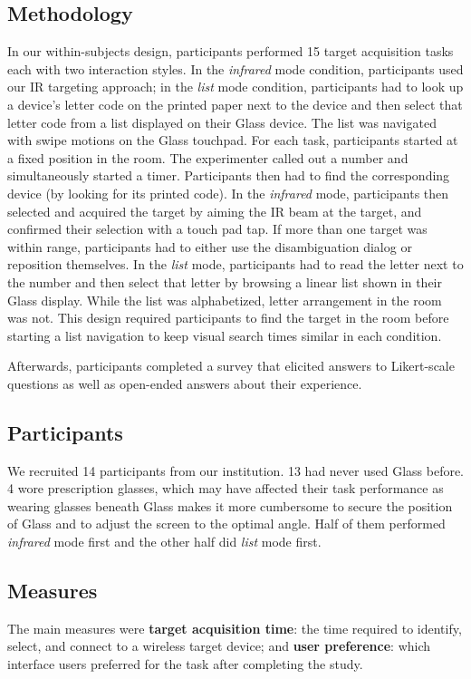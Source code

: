 \subsection{Methodology}
In our within-subjects design, participants performed 15 target acquisition tasks each with two interaction styles. In the {\em infrared} mode condition, participants used our IR targeting approach; in the {\em list} mode condition, participants had to look up a device's letter code on the printed paper next to the device and then select that letter code from a list displayed on their Glass device. The list was navigated with swipe motions on the Glass touchpad. For each task, participants started at a fixed position in the room. The experimenter called out a number and simultaneously started a timer. Participants then had to find the corresponding device (by looking for its printed code). In the {\em infrared} mode, participants then selected and acquired the target by aiming the IR beam at the target, and confirmed their selection with a touch pad tap. If more than one target was within range, participants had to either use the disambiguation dialog or reposition themselves. In the {\em list} mode, participants had to read the letter next to the number and then select that letter by browsing a linear list shown in their Glass display. While the list was alphabetized, letter arrangement in the room was not. This design required participants to find the target in the room before starting a list navigation to keep visual search times similar in each condition.

Afterwards, participants completed a survey that elicited answers to Likert-scale questions as well as open-ended answers about their experience.

\subsection{Participants}
We recruited 14 participants from our institution. 13 had never used Glass before. 4 wore prescription glasses, which may have affected their task performance as wearing glasses beneath Glass makes it more cumbersome to secure the position of Glass and to adjust the screen to the optimal angle. Half of them performed {\em infrared} mode first and the other half did {\em list} mode first.

\subsection{Measures}
The main measures were {\bf target acquisition time}: the time required to identify, select, and connect to a wireless target device; and {\bf user preference}: which interface users preferred for the task after completing the study.

